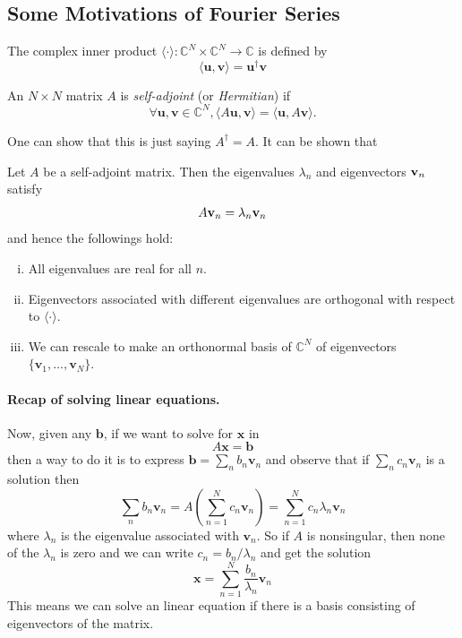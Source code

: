 \documentclass[a4paper]{article}
\begin{document}
\subsection{Some Motivations of Fourier Series}
\begin{definition}
    The complex inner product $\langle\cdot\rangle:\mathbb C^N\times\mathbb C^N\to\mathbb C$ is defined by
    \begin{equation}
        \langle\mathbf{u},\mathbf{v}\rangle=\mathbf{u}^\dagger\mathbf{v}
    \end{equation}
\end{definition}
\begin{definition}
    An $N\times N$  matrix $A$ is \textit{self-adjoint} (or \textit{Hermitian}) if
    $$\forall\mathbf{u},\mathbf{v}\in\mathbb C^N,\langle A\mathbf{u},\mathbf{v}\rangle=\langle\mathbf{u},A\mathbf{v}\rangle.$$
\end{definition}
One can show that this is just saying $A^\dagger=A$.
It can be shown that
\begin{proposition}
    Let $A$ be a self-adjoint matrix. Then the eigenvalues $ \lambda_n $ and eigenvectors $ {\bf v}_n $ satisfy
    \begin{equation}
        A {\bf v}_n=\lambda_n{\bf v}_n
    \end{equation}
    and hence the followings hold:
    \begin{enumerate}[(i).]
        \item All eigenvalues are real for all $n$.
        \item Eigenvectors associated with different eigenvalues are orthogonal with respect to $\langle\cdot\rangle$.
        \item We can rescale to make an orthonormal basis of $\mathbb C^N$ of eigenvectors $\{\mathbf{v}_1,\ldots,\mathbf{v}_N\}$.
    \end{enumerate}
\end{proposition}
\paragraph{Recap of solving linear equations.}
Now, given any $\mathbf{b}$, if we want to solve for $\mathbf{x}$ in
\begin{equation}
    A\mathbf{x}=\mathbf{b}
\end{equation}
then a way to do it is to express $\mathbf{b}=\sum_nb_n\mathbf{v}_n$ and observe that if $\sum_nc_n\mathbf{v}_n$ is a solution then
$$\sum_nb_n\mathbf{v}_n=A\left(\sum_{n=1}^Nc_n\mathbf{v}_n\right)=\sum_{n=1}^Nc_n\lambda_n\mathbf{v}_n$$
where $\lambda_n$ is the eigenvalue associated with $\mathbf{v}_n$.
So if $A$ is nonsingular, then none of the $\lambda_n$ is zero and we can write $c_n=b_n/\lambda_n$ and get the solution
\begin{equation}
    \mathbf{x}=\sum_{n=1}^N\frac{b_n}{\lambda_n}\mathbf{v}_n
\end{equation}
This means we can solve an linear equation if there is a basis consisting of eigenvectors of the matrix.
\end{document}
